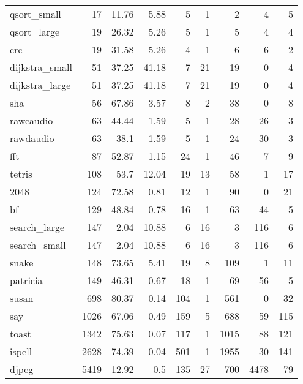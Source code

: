 \begin{tabular}{lrrrrrrrr}
\hline
 qsort\_small    &       17 &    11.76 &   5.88 &    5 &    1 &      2 &     4 &     5 \\
 qsort\_large    &       19 &    26.32 &   5.26 &    5 &    1 &      5 &     4 &     4 \\
 crc            &       19 &    31.58 &   5.26 &    4 &    1 &      6 &     6 &     2 \\
 dijkstra\_small &       51 &    37.25 &  41.18 &    7 &   21 &     19 &     0 &     4 \\
 dijkstra\_large &       51 &    37.25 &  41.18 &    7 &   21 &     19 &     0 &     4 \\
 sha            &       56 &    67.86 &   3.57 &    8 &    2 &     38 &     0 &     8 \\
 rawcaudio      &       63 &    44.44 &   1.59 &    5 &    1 &     28 &    26 &     3 \\
 rawdaudio      &       63 &    38.1  &   1.59 &    5 &    1 &     24 &    30 &     3 \\
 fft            &       87 &    52.87 &   1.15 &   24 &    1 &     46 &     7 &     9 \\
 tetris         &      108 &    53.7  &  12.04 &   19 &   13 &     58 &     1 &    17 \\
 2048           &      124 &    72.58 &   0.81 &   12 &    1 &     90 &     0 &    21 \\
 bf             &      129 &    48.84 &   0.78 &   16 &    1 &     63 &    44 &     5 \\
 search\_large   &      147 &     2.04 &  10.88 &    6 &   16 &      3 &   116 &     6 \\
 search\_small   &      147 &     2.04 &  10.88 &    6 &   16 &      3 &   116 &     6 \\
 snake          &      148 &    73.65 &   5.41 &   19 &    8 &    109 &     1 &    11 \\
 patricia       &      149 &    46.31 &   0.67 &   18 &    1 &     69 &    56 &     5 \\
 susan          &      698 &    80.37 &   0.14 &  104 &    1 &    561 &     0 &    32 \\
 say            &     1026 &    67.06 &   0.49 &  159 &    5 &    688 &    59 &   115 \\
 toast          &     1342 &    75.63 &   0.07 &  117 &    1 &   1015 &    88 &   121 \\
 ispell         &     2628 &    74.39 &   0.04 &  501 &    1 &   1955 &    30 &   141 \\
 djpeg          &     5419 &    12.92 &   0.5  &  135 &   27 &    700 &  4478 &    79 \\

\end{tabular}
